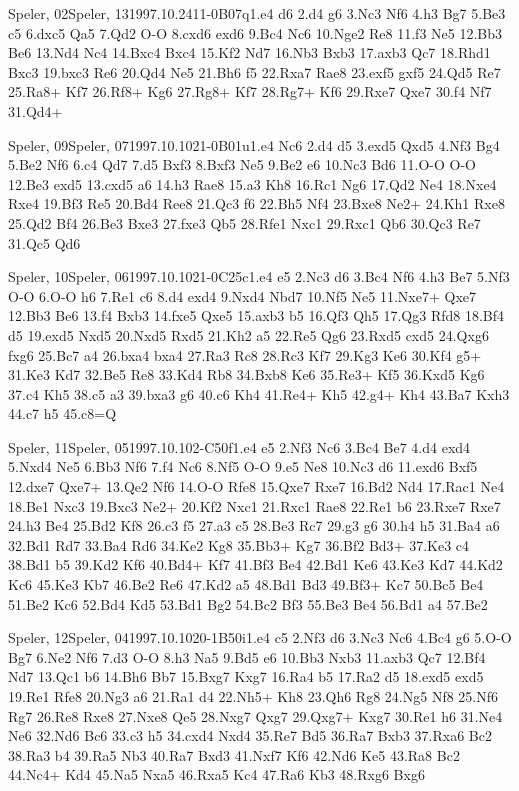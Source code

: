 \documentclass[twocolumn,a4paper,10pt]{report}
\begin{document}
\begin{chessgame}{Speler, 02}{Speler, 13}{1997.10.24}{1}{1-0}{B07q}{1.e4 d6 2.d4 g6 3.Nc3 Nf6 4.h3 Bg7 5.Be3 c5 6.dxc5 Qa5 7.Qd2 O-O 8.cxd6 exd6 9.Bc4 Nc6 10.Nge2 Re8 11.f3 Ne5 12.Bb3 Be6 13.Nd4 Nc4 14.Bxc4 Bxc4 15.Kf2 Nd7 16.Nb3 Bxb3 17.axb3 Qc7 18.Rhd1 Bxc3 19.bxc3 Re6 20.Qd4 Ne5 21.Bh6 f5 22.Rxa7 Rae8 23.exf5 gxf5 24.Qd5 Re7 25.Ra8+ Kf7 26.Rf8+ Kg6 27.Rg8+ Kf7 28.Rg7+ Kf6 29.Rxe7 Qxe7 30.f4 Nf7 31.Qd4+}\end{chessgame}
\begin{chessgame}{Speler, 09}{Speler, 07}{1997.10.10}{2}{1-0}{B01u}{1.e4 Nc6 2.d4 d5 3.exd5 Qxd5 4.Nf3 Bg4 5.Be2 Nf6 6.c4 Qd7 7.d5 Bxf3 8.Bxf3 Ne5 9.Be2 e6 10.Nc3 Bd6 11.O-O O-O 12.Be3 exd5 13.cxd5 a6 14.h3 Rae8 15.a3 Kh8 16.Rc1 Ng6 17.Qd2 Ne4 18.Nxe4 Rxe4 19.Bf3 Re5 20.Bd4 Ree8 21.Qc3 f6 22.Bh5 Nf4 23.Bxe8 Ne2+ 24.Kh1 Rxe8 25.Qd2 Bf4 26.Be3 Bxe3 27.fxe3 Qb5 28.Rfe1 Nxc1 29.Rxc1 Qb6 30.Qc3 Re7 31.Qc5 Qd6}\end{chessgame}
\begin{chessgame}{Speler, 10}{Speler, 06}{1997.10.10}{2}{1-0}{C25c}{1.e4 e5 2.Nc3 d6 3.Bc4 Nf6 4.h3 Be7 5.Nf3 O-O 6.O-O h6 7.Re1 c6 8.d4 exd4 9.Nxd4 Nbd7 10.Nf5 Ne5 11.Nxe7+ Qxe7 12.Bb3 Be6 13.f4 Bxb3 14.fxe5 Qxe5 15.axb3 b5 16.Qf3 Qh5 17.Qg3 Rfd8 18.Bf4 d5 19.exd5 Nxd5 20.Nxd5 Rxd5 21.Kh2 a5 22.Re5 Qg6 23.Rxd5 cxd5 24.Qxg6 fxg6 25.Bc7 a4 26.bxa4 bxa4 27.Ra3 Rc8 28.Rc3 Kf7 29.Kg3 Ke6 30.Kf4 g5+ 31.Ke3 Kd7 32.Be5 Re8 33.Kd4 Rb8 34.Bxb8 Ke6 35.Re3+ Kf5 36.Kxd5 Kg6 37.c4 Kh5 38.c5 a3 39.bxa3 g6 40.c6 Kh4 41.Re4+ Kh5 42.g4+ Kh4 43.Ba7 Kxh3 44.c7 h5 45.c8=Q}\end{chessgame}
\begin{chessgame}{Speler, 11}{Speler, 05}{1997.10.10}{2}{\textonehalf-\textonehalf}{C50f}{1.e4 e5 2.Nf3 Nc6 3.Bc4 Be7 4.d4 exd4 5.Nxd4 Ne5 6.Bb3 Nf6 7.f4 Nc6 8.Nf5 O-O 9.e5 Ne8 10.Nc3 d6 11.exd6 Bxf5 12.dxe7 Qxe7+ 13.Qe2 Nf6 14.O-O Rfe8 15.Qxe7 Rxe7 16.Bd2 Nd4 17.Rac1 Ne4 18.Be1 Nxc3 19.Bxc3 Ne2+ 20.Kf2 Nxc1 21.Rxc1 Rae8 22.Re1 b6 23.Rxe7 Rxe7 24.h3 Be4 25.Bd2 Kf8 26.c3 f5 27.a3 c5 28.Be3 Rc7 29.g3 g6 30.h4 h5 31.Ba4 a6 32.Bd1 Rd7 33.Ba4 Rd6 34.Ke2 Kg8 35.Bb3+ Kg7 36.Bf2 Bd3+ 37.Ke3 c4 38.Bd1 b5 39.Kd2 Kf6 40.Bd4+ Kf7 41.Bf3 Be4 42.Bd1 Ke6 43.Ke3 Kd7 44.Kd2 Kc6 45.Ke3 Kb7 46.Be2 Re6 47.Kd2 a5 48.Bd1 Bd3 49.Bf3+ Kc7 50.Bc5 Be4 51.Be2 Kc6 52.Bd4 Kd5 53.Bd1 Bg2 54.Bc2 Bf3 55.Be3 Be4 56.Bd1 a4 57.Be2}\end{chessgame}
\begin{chessgame}{Speler, 12}{Speler, 04}{1997.10.10}{2}{0-1}{B50i}{1.e4 c5 2.Nf3 d6 3.Nc3 Nc6 4.Bc4 g6 5.O-O Bg7 6.Ne2 Nf6 7.d3 O-O 8.h3 Na5 9.Bd5 e6 10.Bb3 Nxb3 11.axb3 Qc7 12.Bf4 Nd7 13.Qc1 b6 14.Bh6 Bb7 15.Bxg7 Kxg7 16.Ra4 b5 17.Ra2 d5 18.exd5 exd5 19.Re1 Rfe8 20.Ng3 a6 21.Ra1 d4 22.Nh5+ Kh8 23.Qh6 Rg8 24.Ng5 Nf8 25.Nf6 Rg7 26.Re8 Rxe8 27.Nxe8 Qe5 28.Nxg7 Qxg7 29.Qxg7+ Kxg7 30.Re1 h6 31.Ne4 Ne6 32.Nd6 Bc6 33.c3 h5 34.cxd4 Nxd4 35.Re7 Bd5 36.Ra7 Bxb3 37.Rxa6 Bc2 38.Ra3 b4 39.Ra5 Nb3 40.Ra7 Bxd3 41.Nxf7 Kf6 42.Nd6 Ke5 43.Ra8 Bc2 44.Nc4+ Kd4 45.Na5 Nxa5 46.Rxa5 Kc4 47.Ra6 Kb3 48.Rxg6 Bxg6}\end{chessgame}
\end{document}
